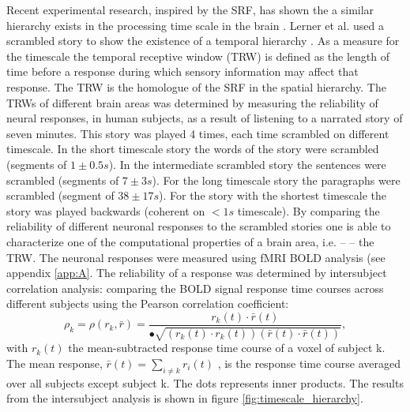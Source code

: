 Recent experimental research, inspired by the SRF, has shown the a similar hierarchy exists in the processing time scale in the brain \cite{hasson2008hierarchy, lerner2011topographic, honey2012slow}.
Lerner et al. used a scrambled story to show the existence of a temporal hierarchy \cite{lerner2011topographic}.
As a measure for the timescale the temporal receptive window (TRW) is defined as the length of time before a response during which sensory information may affect that response.
The TRW is the homologue of the SRF in the spatial hierarchy. 
The TRWs of different brain areas was determined by measuring the reliability of neural responses, in human subjects, as a result of listening to a narrated story of seven minutes. This story was played 4 times, each time scrambled on  different timescale. In the short timescale story the words of the story were scrambled (segments of $1 \pm 0.5 s$). In the intermediate scrambled story the sentences were scrambled (segments of $7 \pm 3 s$). For the long timescale story the paragraphs were scrambled (segment of $38 \pm 17 s$). For the story with the shortest timescale the story was played backwards (coherent on $<1 s$ timescale). By comparing the reliability of different neuronal responses to the scrambled stories one is able to characterize one of the computational properties of a brain area, i.e. --  -- the TRW. The neuronal responses were measured using fMRI BOLD analysis (see appendix \ref{app:A}. The reliability of a response was determined by intersubject correlation analysis: comparing the BOLD signal response time courses across different subjects using the Pearson correlation coefficient:
\begin{equation}\label{eq:intersubject_corrrelation}
\rho_k = \rho(r_k,\bar{r}) = \frac{r_k(t) \cdot \bar{r}(t)}{•\sqrt{(r_k(t) \cdot r_k(t))(\bar{r}(t) \cdot \bar{r} (t))}},
\end{equation}
with $r_k(t)$ the mean-subtracted response time course of a voxel of subject k. The mean response, $\bar{r}(t)=\sum_{i\neq k} r_i(t)$ , is the response time course averaged over all subjects except subject k. The dots represents inner products. The results from the intersubject analysis is shown in figure \ref{fig:timescale_hierarchy}.


